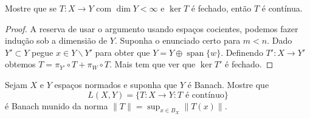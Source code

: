 \documentclass[portuguese]{article}
\theoremstyle{definition}
\begin{document}
	\begin{exer*}[6]
		Mostre que se $T:X\to Y$ com $\dim Y<\infty$ e $\ker T$ é fechado, então $T$ é contínua.
	\end{exer*}
	\begin{proof}
		A reserva de usar o argumento usando espaços cocientes, podemos fazer indução sob a dimensião de $Y$. Suponha o enunciado certo para $m<n$. Dado $Y'\subset Y$ pegue $x\in Y\backslash Y'$ para obter que $Y=Y\oplus \operatorname{span}\{w\}$. Definendo $T':X\to Y'$ obtemos $T=\pi_{Y'}\circ T + \pi_W\circ T$. Mais tem que ver que $\ker T'$ é fechado.
	\end{proof}
	
	\begin{exer*}[9]
		Sejam $X$ e $Y$ espaços normados e suponha que $Y$ é Banach. Mostre que
		\[L(X,Y)=\{T:X\to Y:T\text{ é contínuo}\}\]
		é Banach munido da norma $\| T\|=\sup_{x\in B_X}\| T(x)\|$.
	\end{exer*}
\end{document}
